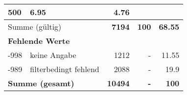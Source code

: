 \begin{longtable}{lXrrr}
       \num{500} &
       \num[round-mode=places,round-precision=2]{6,95} &
         \num[round-mode=places,round-precision=2]{4,76} \\
     \midrule
     \multicolumn{2}{l}{Summe (gültig)} &
       \textbf{\num{7194}} &
     \textbf{100} &
       \textbf{\num[round-mode=places,round-precision=2]{68,55}} \\
     \multicolumn{5}{l}{\textbf{Fehlende Werte}}\\
       -998 &
       keine Angabe &
         \num{1212} &
        - &
         \num[round-mode=places,round-precision=2]{11,55} \\
       -989 &
       filterbedingt fehlend &
         \num{2088} &
        - &
         \num[round-mode=places,round-precision=2]{19,9} \\
     \midrule
     \multicolumn{2}{l}{\textbf{Summe (gesamt)}} &
          \textbf{\num{10494}} &
        \textbf{-} &
        \textbf{100} \\
     \bottomrule
     \end{longtable}
     
